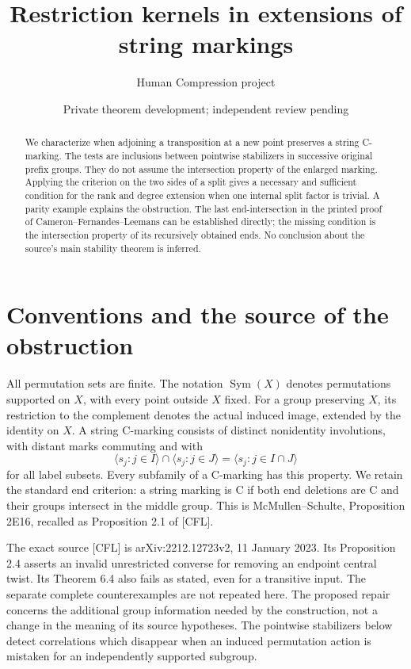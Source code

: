 \documentclass[a4paper,11pt]{article}
\title{Restriction kernels in extensions of string markings}
\author{Human Compression project}\date{Private theorem development; independent review pending}
\newcommand{\Sym}{\operatorname{Sym}}\newcommand{\Alt}{\operatorname{Alt}}
\newcommand{\gen}[1]{\langle#1\rangle}
\begin{document}
\maketitle
\begin{abstract}
We characterize when adjoining a transposition at a new point preserves a
string C-marking. The tests are inclusions between pointwise stabilizers in
successive original prefix groups. They do not assume the intersection
property of the enlarged marking. Applying the criterion on the two sides
of a split gives a necessary and sufficient condition for the rank and
degree extension when one internal split factor is trivial. A parity
example explains the obstruction. The last end-intersection in the printed
proof of Cameron--Fernandes--Leemans can be established directly; the missing
condition is the intersection property of its recursively obtained ends.
No conclusion about the source's main stability theorem is inferred.
\end{abstract}

\section{Conventions and the source of the obstruction}
All permutation sets are finite. The notation $\Sym(X)$ denotes permutations
supported on $X$, with every point outside $X$ fixed. For a group preserving
$X$, its restriction to the complement denotes the actual induced image,
extended by the identity on $X$. A string C-marking consists of distinct
nonidentity involutions, with distant marks commuting and with
\[
 \gen{s_j:j\in I}\cap\gen{s_j:j\in J}=\gen{s_j:j\in I\cap J}
\]
for all label subsets. Every subfamily of a C-marking has this property.
We retain the standard end criterion: a string marking is C if both end
deletions are C and their groups intersect in the middle group. This is
McMullen--Schulte, Proposition 2E16, recalled as Proposition 2.1 of [CFL].

The exact source [CFL] is arXiv:2212.12723v2, 11 January 2023. Its
Proposition 2.4 asserts an invalid unrestricted converse for removing an
endpoint central twist. Its Theorem 6.4 also fails as stated, even for a
transitive input. The separate complete counterexamples are not repeated
here. The proposed repair concerns the additional group information needed
by the construction, not a change in the meaning of its source hypotheses.
The pointwise stabilizers below detect correlations which disappear when
an induced permutation action is mistaken for an independently supported
subgroup.
\end{document}
